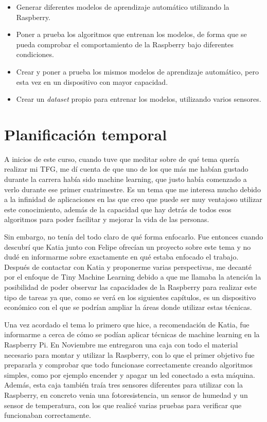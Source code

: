 \documentclass[a4paper, 12pt]{book}
\begin{document}
    \begin{itemize}
        \item Generar diferentes modelos de aprendizaje automático utilizando la Raspberry.
        \item Poner a prueba los algoritmos que entrenan los modelos, de forma que se pueda comprobar el comportamiento de la Raspberry bajo diferentes condiciones.
        \item Crear y poner a prueba los mismos modelos de aprendizaje automático, pero esta vez en un dispositivo con mayor capacidad.
        \item Crear un \textit{dataset} propio para entrenar los modelos, utilizando varios sensores.
    \end{itemize}

\section{Planificación temporal}
\label{sec:planificacion-temporal}

A inicios de este curso, cuando tuve que meditar sobre de qué tema quería realizar mi TFG, me dí cuenta de que uno de los que más me habían gustado durante la carrera había sido machine learning, que justo había comenzado a verlo durante ese primer cuatrimestre. Es un tema que me interesa mucho debido a la infinidad de aplicaciones en las que creo que puede ser muy ventajoso utilizar este conocimiento, además de la capacidad que hay detrás de todos esos algoritmos para poder facilitar y mejorar la vida de las personas.

Sin embargo, no tenía del todo claro de qué forma enfocarlo. Fue entonces cuando descubrí que Katia junto con Felipe ofrecían un proyecto sobre este tema y no dudé en informarme sobre exactamente en qué estaba enfocado el trabajo. Después de contactar con Katia y proponerme varias perspectivas, me decanté por el enfoque de Tiny Machine Learning debido a que me llamaba la atención la posibilidad de poder observar las capacidades de la Raspberry para realizar este tipo de tareas ya que, como se verá en los siguientes capítulos, es un dispositivo económico con el que se podrían ampliar la áreas donde utilizar estas técnicas.

Una vez acordado el tema lo primero que hice, a recomendación de Katia, fue informarme a cerca de cómo se podían aplicar técnicas de machine learning en la Raspberry Pi. En Noviembre me entregaron una caja con todo el material necesario para montar y utilizar la Raspberry, con lo que el primer objetivo fue prepararla y comprobar que todo funcionase correctamente creando algoritmos simples, como por ejemplo encender y apagar un led conectado a esta máquina. Además, esta caja también traía tres sensores diferentes para utilizar con la Raspberry, en concreto venia una fotoresistencia, un sensor de humedad y un sensor de temperatura, con los que realicé varias pruebas para verificar que funcionaban correctamente.
\end{document}

